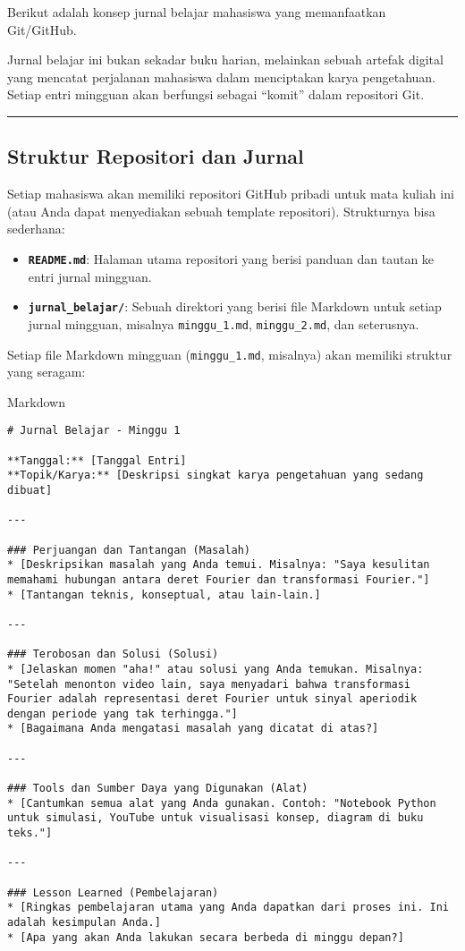 \documentclass[
  letterpaper,
  DIV=11,
  numbers=noendperiod]{scrreprt}
\begin{document}
Berikut adalah konsep jurnal belajar mahasiswa yang memanfaatkan
Git/GitHub.

Jurnal belajar ini bukan sekadar buku harian, melainkan sebuah artefak
digital yang mencatat perjalanan mahasiswa dalam menciptakan karya
pengetahuan. Setiap entri mingguan akan berfungsi sebagai ``komit''
dalam repositori Git.

\begin{center}\rule{0.5\linewidth}{0.5pt}\end{center}

\subsection{Struktur Repositori dan
Jurnal}\label{struktur-repositori-dan-jurnal}

Setiap mahasiswa akan memiliki repositori GitHub pribadi untuk mata
kuliah ini (atau Anda dapat menyediakan sebuah template repositori).
Strukturnya bisa sederhana:

\begin{itemize}
\item
  \textbf{\texttt{README.md}}: Halaman utama repositori yang berisi
  panduan dan tautan ke entri jurnal mingguan.
\item
  \textbf{\texttt{jurnal\_belajar/}}: Sebuah direktori yang berisi file
  Markdown untuk setiap jurnal mingguan, misalnya \texttt{minggu\_1.md},
  \texttt{minggu\_2.md}, dan seterusnya.
\end{itemize}

Setiap file Markdown mingguan (\texttt{minggu\_1.md}, misalnya) akan
memiliki struktur yang seragam:

Markdown

\begin{verbatim}
# Jurnal Belajar - Minggu 1

**Tanggal:** [Tanggal Entri]
**Topik/Karya:** [Deskripsi singkat karya pengetahuan yang sedang dibuat]

---

### Perjuangan dan Tantangan (Masalah)
* [Deskripsikan masalah yang Anda temui. Misalnya: "Saya kesulitan memahami hubungan antara deret Fourier dan transformasi Fourier."]
* [Tantangan teknis, konseptual, atau lain-lain.]

---

### Terobosan dan Solusi (Solusi)
* [Jelaskan momen "aha!" atau solusi yang Anda temukan. Misalnya: "Setelah menonton video lain, saya menyadari bahwa transformasi Fourier adalah representasi deret Fourier untuk sinyal aperiodik dengan periode yang tak terhingga."]
* [Bagaimana Anda mengatasi masalah yang dicatat di atas?]

---

### Tools dan Sumber Daya yang Digunakan (Alat)
* [Cantumkan semua alat yang Anda gunakan. Contoh: "Notebook Python untuk simulasi, YouTube untuk visualisasi konsep, diagram di buku teks."]

---

### Lesson Learned (Pembelajaran)
* [Ringkas pembelajaran utama yang Anda dapatkan dari proses ini. Ini adalah kesimpulan Anda.]
* [Apa yang akan Anda lakukan secara berbeda di minggu depan?]
\end{verbatim}
\end{document}
